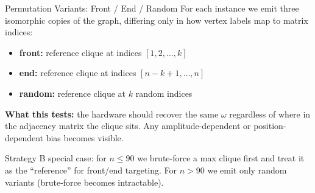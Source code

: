 \documentclass[aspectratio=169]{beamer}
\begin{document}
\begin{frame}{Permutation Variants: Front / End / Random}
    For each instance we emit three isomorphic copies of the graph, differing only in how vertex labels map to matrix indices:

    \begin{itemize}
        \item \textbf{front:} reference clique at indices $[1, 2, \ldots, k]$
        \item \textbf{end:} reference clique at indices $[n-k+1, \ldots, n]$
        \item \textbf{random:} reference clique at $k$ random indices
    \end{itemize}

    \vspace{0.5em}
    \textbf{What this tests:} the hardware should recover the same $\omega$ regardless of where in the adjacency matrix the clique sits. Any amplitude-dependent or position-dependent bias becomes visible.

    \vspace{0.5em}
    \alert{Strategy B special case:} for $n \leq 90$ we brute-force a max clique first and treat it as the ``reference'' for front/end targeting. For $n > 90$ we emit only random variants (brute-force becomes intractable).
\end{frame}

\end{document}

